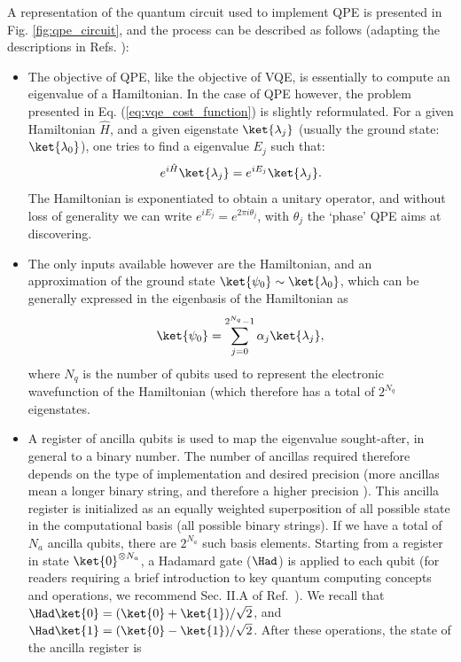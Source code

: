 A representation of the quantum circuit used to implement QPE is presented in Fig. \ref{fig:qpe_circuit}, and the process can be described as follows (adapting the descriptions in Refs. \cite{nielsenQuantumComputationQuantum2010, mcardleQuantumComputationalChemistry2018}):
\begin{itemize}
    \item The objective of QPE, like the objective of VQE, is essentially to compute an eigenvalue of a Hamiltonian. In the case of QPE however, the problem presented in Eq. (\ref{eq:vqe_cost_function}) is slightly reformulated. For a given Hamiltonian $\hat{H}$, and a given eigenstate $\ket{\lambda_j}$ (usually the ground state:  $\ket{\lambda_0}$), one tries to find a eigenvalue $E_j$ such that:
    \begin{equation} \label{eq:qpe_problem}
       e^{i\hat{H}} \ket{\lambda_j}= e^{ i E_j} \ket{\lambda_j}.
    \end{equation}
    The Hamiltonian is exponentiated to obtain a unitary operator, and without loss of generality we can write $e^{iE_j} = e^{2 \pi i\theta_j}$, with $\theta_j$ the `phase' QPE aims at discovering.
    \item The only inputs available however are the Hamiltonian, and an approximation of the ground state $\ket{\psi_0} \sim \ket{\lambda_0}$, which can be generally expressed in the eigenbasis of the Hamiltonian as 
    \begin{equation}
        \ket{\psi_0} = \sum_{j=0}^{2^{N_q}-1} \alpha_j \ket{\lambda_j},
    \end{equation}
    where $N_q$ is the number of qubits used to represent the electronic wavefunction of the Hamiltonian (which therefore has a total of $2^{N_q}$ eigenstates.
    \item A register of ancilla qubits is used to map the eigenvalue sought-after, in general to a binary number. The number of ancillas required therefore depends on the type of implementation and desired precision (more ancillas mean a longer binary string, and therefore a higher precision \cite{nielsenQuantumComputationQuantum2010}). This ancilla register is initialized as an equally weighted superposition of all possible state in the computational basis (all possible binary strings). If we have a total of $N_a$ ancilla qubits, there are $2^{N_a}$ such basis elements. Starting from a register in state $\ket{0}^{\otimes N_a}$, a Hadamard gate ($\Had$) is applied to each qubit (for readers requiring a brief introduction to key quantum computing concepts and operations, we recommend Sec. II.A of Ref.~\cite{mcardleQuantumComputationalChemistry2018}). We recall that $\Had\ket{0} = (\ket{0} + \ket{1})/\sqrt{2}$, and $\Had\ket{1} = (\ket{0} - \ket{1})/\sqrt{2}$. After these operations, the state of the ancilla register is

\end{itemize}
